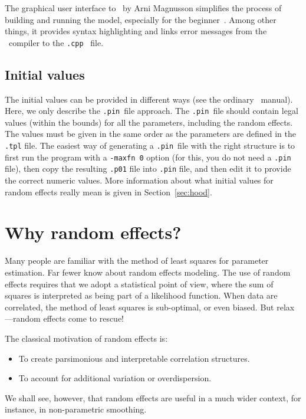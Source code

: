 \documentclass{admbmanual}
\begin{document}
The graphical user interface to \scAB\ by Arni Magnusson simplifies the process
of building and running the model, especially for the
beginner~\cite{admb_news_july09}. Among other things, it provides syntax
highlighting and links error messages from the \cplus\ compiler to the
\texttt{.cpp}~ file.

\subsection{Initial values}

The initial values can be provided in different ways (see the ordinary \scAB\
manual). Here, we only describe the \texttt{.pin}~file approach. The
\texttt{.pin}~file should contain legal values (within the bounds) for all the
parameters, including the random effects. The values must be given in the same
order as the parameters are defined in the \texttt{.tpl} file. The easiest way
of generating a \texttt{.pin}~file with the right structure is to first run the
program with a \texttt{-maxfn 0} option (for this, you do not need a
\texttt{.pin} file), then copy the resulting \texttt{.p01} file into
\texttt{.pin} file, and then edit it to provide the correct numeric values. More
information about what initial values for random effects really mean is given in
Section~\ref{sec:hood}.

\section{Why random effects?}

Many people are familiar with the method of least squares for parameter
estimation. Far fewer know about random effects modeling. The use of random
effects requires that we adopt a statistical point of view, where the sum of
squares is interpreted as being part of a likelihood function. When data are
correlated, the method of least squares is sub-optimal, or even biased. But
relax---random effects come to rescue! \index{random effects}

The classical motivation of random effects is:
\begin{itemize}
  \item To create parsimonious and interpretable correlation structures.

  \item To account for additional variation or overdispersion.
\end{itemize}
We shall see, however, that random effects are useful in a much wider context,
for instance, in non-parametric smoothing. %
\end{document}
